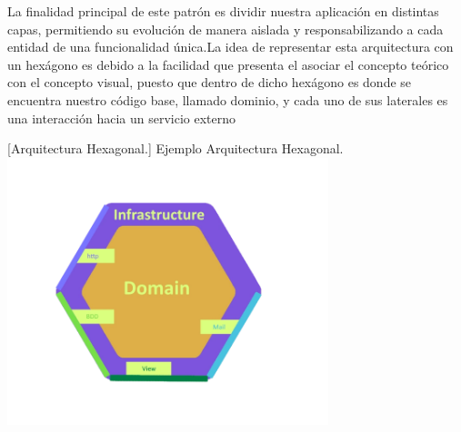 \begin{itemize}
    La finalidad principal de este patrón es dividir nuestra aplicación en distintas capas, permitiendo su evolución de manera aislada y responsabilizando a cada entidad de una funcionalidad única.La idea de representar esta arquitectura con un hexágono es debido a la facilidad que presenta el asociar el concepto teórico con el concepto visual, puesto que dentro de dicho hexágono es donde se encuentra nuestro código base, llamado dominio, y cada uno de sus laterales es una interacción hacia un servicio externo

    \vspace{2mm}
     \begin{minipage}{0.9\textwidth}
        \centering
        [{Arquitectura Hexagonal.}]{ Ejemplo Arquitectura Hexagonal. }
        \label{hexagonal}
         \includegraphics[width=0.7\textwidth]{Images/hexagonal.png}
    \end{minipage}
    
\end{itemize}

